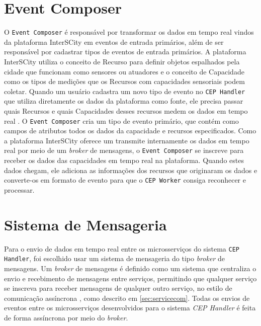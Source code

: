 \section{Event Composer} \label{sec:eventcomposer}
O \texttt{Event Composer} é responsável por transformar os dados em tempo real vindos da plataforma InterSCity em eventos de entrada primários, além de ser responsável por cadastrar tipos de eventos de entrada primários. A plataforma InterSCity utiliza o conceito de Recurso para definir objetos espalhados pela cidade que funcionam como sensores ou atuadores e o conceito de Capacidade como os tipos de medições que os Recursos com capacidades sensoriais podem coletar. Quando um usuário cadastra um novo tipo de evento no \texttt{CEP Handler} que utiliza diretamente os dados da plataforma como fonte, ele precisa passar quais Recursos e quais Capacidades desses recursos medem os dados em tempo real%
. O \texttt{Event Composer} cria um tipo de evento primário, que contém como campos de atributos todos os dados da capacidade e recursos especificados. 
Como a plataforma InterSCity oferece um transmite internamente os dados em tempo real por meio de um \textit{broker} de mensagens, o \texttt{Event Composer} se inscreve%
para receber os dados das capacidades em tempo real na plataforma. Quando estes dados chegam, ele adiciona as informações dos recursos que originaram os dados e converte-os em formato de evento para que o \texttt{CEP Worker} consiga reconhecer e processar.

\section{Sistema de Mensageria}
\label{sec:messaging-system}
Para o envio de dados em tempo real entre os microsserviços do sistema \texttt{CEP Handler}, foi escolhido usar um sistema de mensageria do tipo \textit{broker} de mensagens. Um \textit{broker} de mensagens é definido como um sistema que centraliza o envio e recebimento de mensagens entre serviços, permitindo que qualquer serviço se inscreva para receber mensagens de qualquer outro serviço, no estilo de comunicação assíncrona , como descrito em \autoref{sec:servicecom}. Todas os envios de eventos entre os microsserviços desenvolvidos para o sistema \textit{CEP Handler} é feita de forma assíncrona por meio do \textit{broker}. 



